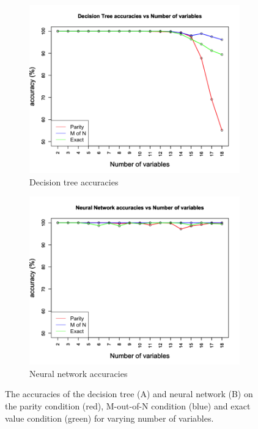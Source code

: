 \documentclass[letterpaper]{article} %
\begin{document}
 \begin{figure}[h!]
    \centering
    \begin{subfigure}[t]{0.4\textwidth}
        \centering
        \includegraphics[width = 1 \linewidth]{Figures/DTone.png}
        \caption{Decision tree accuracies}
        \label{fig:DTvsNN_DT}
    \end{subfigure}%
    
    
    \begin{subfigure}[t]{0.4\textwidth}
        \centering
        \includegraphics[width = 1 \linewidth]{Figures/NNone.png}
        \caption{Neural network accuracies}
        \label{fig:DTvsNN_NN}
    \end{subfigure}%
    \caption{The accuracies of the decision tree (A) and neural network (B) on the parity condition (red), M-out-of-N condition (blue) and exact value condition (green) for varying number of variables.}
    \label{fig:DTvsNN}
\end{figure}
\end{document}
